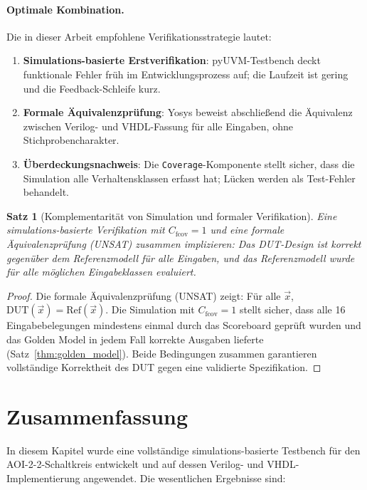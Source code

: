 ﻿\documentclass[12pt,a4paper]{report}
\newtheorem{theorem}{Satz}[section]
\begin{document}
\paragraph{Optimale Kombination.}
Die in dieser Arbeit empfohlene Verifikationsstrategie lautet:

\begin{enumerate}
    \item \textbf{Simulations-basierte Erstverifikation}: pyUVM-Testbench
          deckt funktionale Fehler früh im Entwicklungsprozess auf; die
          Laufzeit ist gering und die Feedback-Schleife kurz.
    \item \textbf{Formale Äquivalenzprüfung}: Yosys beweist abschließend die
          Äquivalenz zwischen Verilog- und VHDL-Fassung für alle Eingaben,
          ohne Stichprobencharakter.
    \item \textbf{Überdeckungsnachweis}: Die \texttt{Coverage}-Komponente stellt
          sicher, dass die Simulation alle Verhaltensklassen erfasst hat;
          Lücken werden als Test-Fehler behandelt.
\end{enumerate}

\begin{theorem}[Komplementarität von Simulation und formaler Verifikation]
\label{thm:komplementaritaet}
Eine simula\-tions-basierte Verifikation mit $C_{\mathrm{fcov}} = 1$
\emph{und} eine formale Äquivalenzprüfung (UNSAT) zusammen implizieren:
Das DUT-Design ist korrekt gegenüber dem Referenzmodell für alle Eingaben,
und das Referenzmodell wurde für alle möglichen Eingabeklassen evaluiert.
\end{theorem}

\begin{proof}
Die formale Äquivalenzprüfung (UNSAT) zeigt: Für alle $\vec{x}$, $\mathrm{DUT}(\vec{x}) = \mathrm{Ref}(\vec{x})$.
Die Simulation mit $C_{\mathrm{fcov}} = 1$ stellt sicher, dass alle 16
Eingabebelegungen mindestens einmal durch das Scoreboard geprüft wurden und
das Golden Model in jedem Fall korrekte Ausgaben lieferte
(Satz~\ref{thm:golden_model}). Beide Bedingungen zusammen garantieren
vollständige Korrektheit des DUT gegen eine validierte Spezifikation.
\end{proof}

\section{Zusammenfassung}
\label{subsec:pyuvm_zusammenfassung}

In diesem Kapitel wurde eine vollständige simulations-basierte Testbench für
den AOI-2-2-Schaltkreis entwickelt und auf dessen Verilog- und
VHDL-Implementierung angewendet. Die wesentlichen Ergebnisse sind:
\end{document}
